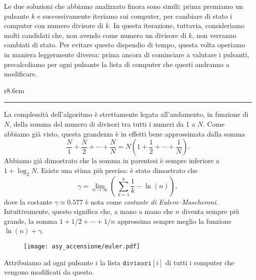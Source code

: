 \NlogNLenta
Le due soluzioni che abbiamo analizzato finora sono simili: prima premiamo un pulsante $k$ e successivamente iteriamo sui computer, per cambiare di stato i computer con numero divisore di $k$. In questa iterazione, tuttavia, consideriamo molti candidati che, non avendo come numero un divisore di $k$, non verranno cambiati di stato.
Per evitare questo dispendio di tempo, questa volta operiamo in maniera leggermente diversa: prima ancora di cominciare a valutare i pulsanti, precalcoliamo per ogni pulsante la lista di computer che questi andranno a modificare.
\begin{wrapfigure}{r}{8.6cm}
\vspace*{-.3cm}
\begin{minipage}{8.5cm}
	\begin{mdframed}[style=tight]
		\begingroup
		\setlength{\fboxsep}{0pt}%
		\colorbox{black!50!white}{}
		\endgroup
		\hrule\vspace*{2mm}
		\hspace{.03\linewidth}\begin{minipage}{.94\linewidth}
La complessità dell'algoritmo è strettamente legata all'andamento, in funzione di $N$, della somma del numero di divisori tra tutti i numeri da 1 a $N$. Come abbiamo già visto, questa grandezza è in effetti bene approssimata dalla somma $$\frac{N}{1}+\frac{N}{2}+\cdots+\frac{N}{N} = N \left(1 + \frac{1}{2} + \cdots + \frac{1}{N}\right).$$
Abbiamo già dimostrato che la somma in parentesi è sempre inferiore a $1 + \log_2 N$. Esiste una stima più precisa: è stato dimostrato che $$\gamma = \lim_{n \rightarrow \infty } \left(\,\sum_{k=1}^n \frac{1}{k} - \ln(n) \right),$$
dove la costante $\gamma \approx 0.577$ è nota come \emph{costante di Eulero--Mascheroni}. Intuitivamente, questo significa che, a mano a mano che $n$ diventa sempre più grande, la somma $1 + 1/2 + \cdots + 1/n$ approssima sempre meglio la funzione $\ln(n) + \gamma$.
\begin{figure}[H]\centering\texttt{[image: asy\_accensione/euler.pdf]}\end{figure}
		\end{minipage}
	\end{mdframed}
\end{minipage}
\vspace*{-2cm}
\end{wrapfigure}
Attribuiamo ad ogni pulsante $i$ la lista $\texttt{divisori}[i]$ di tutti i computer che vengono modificati da questo.

